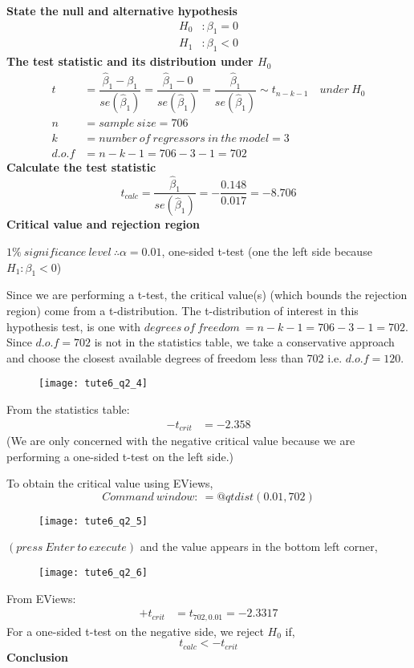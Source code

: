 \documentclass[12pt]{report}
\begin{document}
\noindent \textbf{State the null and alternative hypothesis}
\begin{align*}
H_0&: \beta_1 = 0 \\
H_1&: \beta_1 < 0
\end{align*}
\noindent \textbf{The test statistic and its distribution under $H_0$}
\begin{align*}
t &= \dfrac{\hat{\beta}_1 - \beta_1}{se(\hat{\beta}_1)} = \dfrac{\hat{\beta}_1 - 0}{se(\hat{\beta}_1)} = \dfrac{\hat{\beta}_1}{se(\hat{\beta}_1)} \sim t_{n-k-1} \quad under\ H_0 \\
n &= sample\ size = 706 \\
k &= number\ of\ regressors\ in\ the\ model = 3 \\
d.o.f &= n-k-1=706 - 3 - 1 = 702
\end{align*}
\noindent \textbf{Calculate the test statistic}
$$t_{calc} = \dfrac{\hat{\beta}_1}{se(\hat{\beta}_1)} = -\dfrac{0.148}{0.017} = -8.706$$
\noindent \textbf{Critical value and rejection region}

\noindent $1\%\ significance\ level\ \therefore \alpha = 0.01$, one-sided t-test (one the left side because $H_1: \beta_1 < 0$)

\noindent Since we are performing a t-test, the critical value(s) (which bounds the rejection region) come from a t-distribution. The t-distribution of interest in this hypothesis test, is one with $degrees\ of\ freedom\ = n - k - 1 = 706 - 3 - 1 = 702$. Since $d.o.f = 702$ is not in the statistics table, we take a conservative approach and choose the closest available degrees of freedom less than 702 i.e. $d.o.f=120$. 


\begin{figure}[H]
	\centering
	\texttt{[image: tute6\_q2\_4]}
\end{figure}
\vspace{-\baselineskip}
\noindent From the statistics table: \begin{align*}
-t_{crit} &= -2.358 
\end{align*} (We are only concerned with the negative critical value because we are performing a one-sided t-test on the left side.)

\noindent To obtain the critical value using EViews,
$$Command\ window:\ =@qtdist(0.01,702)$$
\begin{figure}[H]
	\centering
	\texttt{[image: tute6\_q2\_5]}
\end{figure}
\vspace{-\baselineskip}\centering $(press\ Enter\ to\ execute)$
\justify and the value appears in the bottom left corner,
\begin{figure}[H]
	\centering
	\texttt{[image: tute6\_q2\_6]}
\end{figure}
\vspace{-\baselineskip}
\noindent From EViews: \begin{align*}
+t_{crit} &= t_{702,0.01} = -2.3317
\end{align*}
\noindent For a one-sided t-test on the negative side, we reject $H_0$ if,
$$t_{calc} < -t_{crit}$$
\noindent \textbf{Conclusion}
\end{document}
